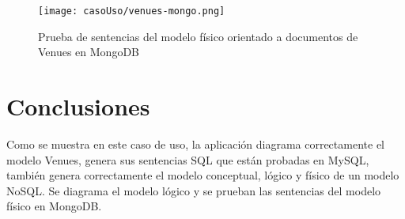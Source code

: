 \begin{figure}[H]
    \centering
    \texttt{[image: casoUso/venues-mongo.png]}
    \caption{Prueba de sentencias del modelo físico orientado a documentos de Venues en MongoDB}
    \label{img:venues-mongo}
\end{figure}

\section{Conclusiones}
Como se muestra en este caso de uso, la aplicación diagrama correctamente el modelo Venues, genera sus sentencias SQL que están probadas en MySQL, también genera correctamente el modelo conceptual, lógico y físico de un modelo NoSQL. Se diagrama el modelo lógico y se prueban las sentencias del modelo físico en MongoDB.

